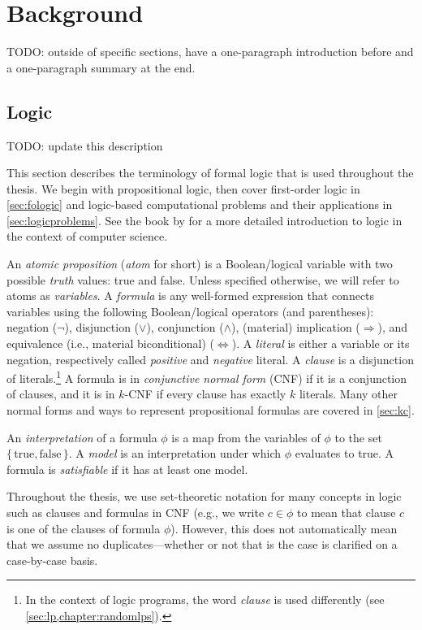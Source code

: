 \chapter{Background}

TODO: outside of specific sections, have a one-paragraph introduction before and a one-paragraph summary at the end.

\section{Logic}

TODO: update this description

This section describes the terminology of formal logic that is used throughout the thesis. We begin with propositional logic, then cover first-order logic in \cref{sec:fologic} and logic-based computational problems and their applications in \cref{sec:logicproblems}. See the book by \cite{DBLP:books/daglib/0029942} for a more detailed introduction to logic in the context of computer science.

An \emph{atomic proposition} (\emph{atom} for short) is a Boolean/logical variable with two possible \emph{truth} values: true and false. Unless specified otherwise, we will refer to atoms as \emph{variables}. A \emph{formula} is any well-formed expression that connects variables using the following Boolean/logical operators (and parentheses): negation ($\neg$), disjunction ($\lor$), conjunction ($\land$), (material) implication ($\Rightarrow$), and equivalence (i.e., material biconditional) ($\Leftrightarrow$). A \emph{literal} is either a variable or its negation, respectively called \emph{positive} and \emph{negative} literal. A \emph{clause} is a disjunction of literals.\footnote{In the context of logic programs, the word \emph{clause} is used differently (see \cref{sec:lp,chapter:randomlps}).} A formula is in \emph{conjunctive normal form} (CNF) if it is a conjunction of clauses, and it is in $k$-CNF if every clause has exactly $k$ literals. Many other normal forms and ways to represent propositional formulas are covered in \cref{sec:kc}.

An \emph{interpretation} of a formula $\phi$ is a map from the variables of $\phi$ to the set $\{\, \text{true}, \text{false} \,\}$. A \emph{model} is an interpretation under which $\phi$ evaluates to true. A formula is \emph{satisfiable} if it has at least one model.

Throughout the thesis, we use set-theoretic notation for many concepts in logic such as clauses and formulas in CNF (e.g., we write $c \in \phi$ to mean that clause $c$ is one of the clauses of formula $\phi$). However, this does not automatically mean that we assume no duplicates---whether or not that is the case is clarified on a case-by-case basis.


